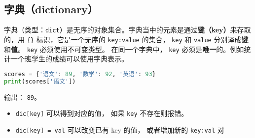 \subsection{字典（dictionary）}
字典（类型：\verb|dict|）是无序的对象集合。字典当中的元素是通过\textbf{键（key）}来存取的，用 \verb|{}| 标识，它是一个无序的 \verb|key:value| 的集合， \verb|key| 和 \verb|value| 分别译成\textbf{键}和\textbf{值}。 \verb|key| 必须使用不可变类型。 在同一个字典中， \verb|key| 必须是\textbf{唯一}的。例如统计一个班学生的成绩可以使用字典表示。
\begin{lstlisting}[language=python]
scores = {'语文': 89, '数学': 92, '英语': 93}
print(scores['语文'])
\end{lstlisting}
输出： \verb|89|。

\begin{itemize}
\item \verb|dic[key]| 可以得到对应的值， 如果 \verb|key| 不存在则报错。
\item \verb|dic[key] = val| 可以改变已有 key 的值， 或者增加新的 \verb|key:val| 对
\end{itemize}
